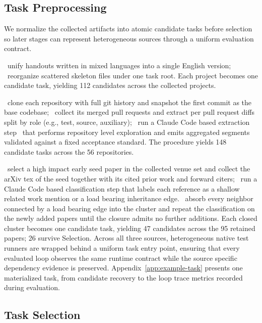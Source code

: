 \vspace{-3pt}
\subsection{Task Preprocessing}\label{sec:preprocessing}

We normalize the collected artifacts into atomic candidate tasks before selection so later stages can represent heterogeneous sources through a uniform evaluation contract.

 ~unify handouts written in mixed languages into a single English version; ~reorganize scattered skeleton files under one task root. Each project becomes one candidate task, yielding 112 candidates across the collected projects.

 ~clone each repository with full git history and snapshot the first commit as the base codebase; ~collect its merged pull requests and extract per pull request diffs split by role (e.g., test, source, auxiliary); ~run a Claude Code based extraction step~\cite{claude_code} that performs repository level exploration and emits aggregated segments validated against a fixed acceptance standard. The procedure yields 148 candidate tasks across the 56 repositories.

 ~select a high impact early seed paper in the collected venue set and collect the arXiv tex of the seed together with its cited prior work and forward citers; ~run a Claude Code based classification step that labels each reference as a shallow related work mention or a load bearing inheritance edge. ~absorb every neighbor connected by a load bearing edge into the cluster and repeat the classification on the newly added papers until the closure admits no further additions. Each closed cluster becomes one candidate task, yielding 47 candidates across the 95 retained papers; 26 survive Selection.
Across all three sources, heterogeneous native test runners are wrapped behind a uniform task entry point, ensuring that every evaluated loop observes the same runtime contract while the source specific dependency evidence is preserved.
Appendix~\ref{app:example-task} presents one materialized \lhb{} task, from candidate recovery to the loop trace metrics recorded during evaluation.

\vspace{-3pt}
\subsection{Task Selection}\label{sec:dedup-quality}

